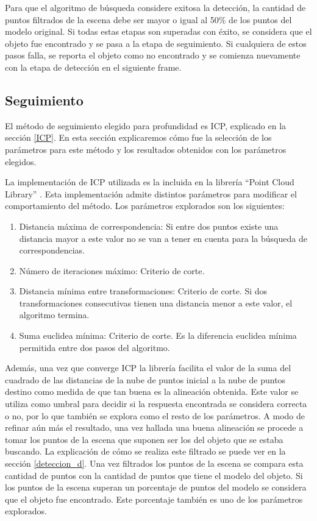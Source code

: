 Para que el algoritmo de búsqueda considere exitosa la detección, la cantidad de puntos filtrados de la escena debe ser mayor o igual al 50\% de los puntos del modelo original. Si todas estas etapas son superadas con éxito, se considera que el objeto fue encontrado y se pasa a la etapa de seguimiento. Si cualquiera de estos pasos falla, se reporta el objeto como no encontrado y se comienza nuevamente con la etapa de detección en el siguiente frame.

\subsection{Seguimiento}\label{tracking_d}
El método de seguimiento elegido para profundidad es ICP, explicado en la sección \ref{ICP}. En esta sección explicaremos cómo fue la selección de los parámetros para este método y los resultados obtenidos con los parámetros elegidos.

La implementación de ICP utilizada es la incluida en la librería ``Point Cloud Library'' \cite{Rusu_ICRA2011_PCL}. Esta implementación admite distintos parámetros para modificar el comportamiento del método. Los parámetros explorados son los siguientes:

\begin{enumerate}
	\item Distancia máxima de correspondencia: Si entre dos puntos existe una distancia mayor a este valor no se van a tener en cuenta para la búsqueda de correspondencias.
	\item Número de iteraciones máximo: Criterio de corte.
	\item Distancia mínima entre transformaciones: Criterio de corte. Si dos transformaciones consecutivas tienen una distancia menor a este valor, el algoritmo termina.
	\item Suma euclidea mínima: Criterio de corte. Es la diferencia euclidea mínima permitida entre dos pasos del algoritmo.
\end{enumerate}

Además, una vez que converge ICP la librería facilita el valor de la suma del cuadrado de las distancias de la nube de puntos inicial a la nube de puntos destino como medida de que tan buena es la alineación obtenida. Este valor se utiliza como umbral para decidir si la respuesta encontrada se considera correcta o no, por lo que también se explora como el resto de los parámetros. A modo de refinar aún más el resultado, una vez hallada una buena alineación se procede a tomar los puntos de la escena que suponen ser los del objeto que se estaba buscando. La explicación de cómo se realiza este filtrado se puede ver en la sección \ref{deteccion_d}. Una vez filtrados los puntos de la escena se compara esta cantidad de puntos con la cantidad de puntos que tiene el modelo del objeto. Si los puntos de la escena superan un porcentaje de puntos del modelo se considera que el objeto fue encontrado. Este porcentaje también es uno de los parámetros explorados.




